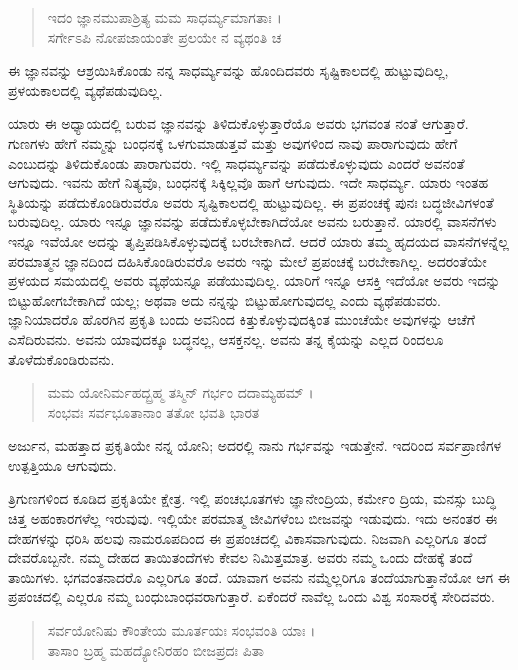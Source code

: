 \begin{verse}
ಇದಂ ಜ್ಞಾನಮುಪಾಶ್ರಿತ್ಯ ಮಮ ಸಾಧರ್ಮ್ಯಮಾಗತಾಃ ।\\ಸರ್ಗೇಽಪಿ ನೋಪಜಾಯಂತೇ ಪ್ರಲಯೇ ನ ವ್ಯಥಂತಿ ಚ 
\end{verse}

{\small ಈ ಜ್ಞಾನವನ್ನು ಆಶ್ರಯಿಸಿಕೊಂಡು ನನ್ನ ಸಾಧರ್ಮ್ಯವನ್ನು ಹೊಂದಿದವರು ಸೃಷ್ಟಿಕಾಲದಲ್ಲಿ ಹುಟ್ಟುವುದಿಲ್ಲ, ಪ್ರಳಯಕಾಲದಲ್ಲಿ ವ್ಯಥೆಪಡುವುದಿಲ್ಲ.}

ಯಾರು ಈ ಅಧ್ಯಾಯದಲ್ಲಿ ಬರುವ ಜ್ಞಾನವನ್ನು ತಿಳಿದುಕೊಳ್ಳುತ್ತಾರೆಯೊ ಅವರು ಭಗವಂತ ನಂತೆ ಆಗುತ್ತಾರೆ. ಗುಣಗಳು ಹೇಗೆ ನಮ್ಮನ್ನು ಬಂಧನಕ್ಕೆ ಒಳಗುಮಾಡುತ್ತವೆ ಮತ್ತು ಅವುಗಳಿಂದ ನಾವು ಪಾರಾಗುವುದು ಹೇಗೆ ಎಂಬುದನ್ನು ತಿಳಿದುಕೊಂಡು ಪಾರಾಗುವರು. ಇಲ್ಲಿ ಸಾಧರ್ಮ್ಯವನ್ನು ಪಡೆದುಕೊಳ್ಳುವುದು ಎಂದರೆ ಅವನಂತೆ ಆಗುವುದು. ಇವನು ಹೇಗೆ ನಿತ್ಯವೊ, ಬಂಧನಕ್ಕೆ ಸಿಕ್ಕಿಲ್ಲವೊ ಹಾಗೆ ಆಗುವುದು. ಇದೇ ಸಾಧರ್ಮ್ಯ. ಯಾರು ಇಂತಹ ಸ್ಥಿತಿಯನ್ನು ಪಡೆದುಕೊಂಡಿರುವರೊ ಅವರು ಸೃಷ್ಟಿಕಾಲದಲ್ಲಿ ಹುಟ್ಟುವುದಿಲ್ಲ. ಈ ಪ್ರಪಂಚಕ್ಕೆ ಪುನಃ ಬದ್ಧಜೀವಿಗಳಂತೆ ಬರುವುದಿಲ್ಲ. ಯಾರು ಇನ್ನೂ ಜ್ಞಾನವನ್ನು ಪಡೆದುಕೊಳ್ಳಬೇಕಾಗಿದೆಯೋ ಅವನು ಬರುತ್ತಾನೆ. ಯಾರಲ್ಲಿ ವಾಸನೆಗಳು ಇನ್ನೂ ಇವೆಯೋ ಅದನ್ನು ತೃಪ್ತಿಪಡಿಸಿಕೊಳ್ಳುವುದಕ್ಕೆ ಬರಬೇಕಾಗಿದೆ. ಆದರೆ ಯಾರು ತಮ್ಮ ಹೃದಯದ ವಾಸನೆಗಳನ್ನೆಲ್ಲ ಪರಮಾತ್ಮನ ಜ್ಞಾನದಿಂದ ದಹಿಸಿಕೊಂಡಿರುವರೊ ಅವರು ಇನ್ನು ಮೇಲೆ ಪ್ರಪಂಚಕ್ಕೆ ಬರಬೇಕಾಗಿಲ್ಲ. ಅದರಂತೆಯೇ ಪ್ರಳಯದ ಸಮಯದಲ್ಲಿ ಅವರು ವ್ಯಥೆಯನ್ನೂ ಪಡೆಯುವುದಿಲ್ಲ. ಯಾರಿಗೆ ಇನ್ನೂ ಆಸಕ್ತಿ ಇದೆಯೋ ಅವರು ಇದನ್ನು ಬಿಟ್ಟುಹೋಗಬೇಕಾಗಿದೆ ಯಲ್ಲ; ಅಥವಾ ಅದು ನನ್ನನ್ನು ಬಿಟ್ಟುಹೋಗುವುದಲ್ಲ ಎಂದು ವ್ಯಥೆಪಡುವರು. ಜ್ಞಾನಿಯಾದರೊ ಹೊರಗಿನ ಪ್ರಕೃತಿ ಬಂದು ಅವನಿಂದ ಕಿತ್ತುಕೊಳ್ಳುವುದಕ್ಕಿಂತ ಮುಂಚೆಯೇ ಅವುಗಳನ್ನು ಆಚೆಗೆ ಎಸೆದಿರುವನು. ಅವನು ಯಾವುದಕ್ಕೂ ಬದ್ಧನಲ್ಲ, ಆಸಕ್ತನಲ್ಲ. ಅವನು ತನ್ನ ಕೈಯನ್ನು ಎಲ್ಲದ ರಿಂದಲೂ ತೊಳೆದುಕೊಂಡಿರುವನು.

\begin{verse}
ಮಮ ಯೋನಿರ್ಮಹದ್ಬ್ರಹ್ಮ ತಸ್ಮಿನ್ ಗರ್ಭಂ ದದಾಮ್ಯಹಮ್ ।\\ಸಂಭವಃ ಸರ್ವಭೂತಾನಾಂ ತತೋ ಭವತಿ ಭಾರತ 
\end{verse}

{\small ಅರ್ಜುನ, ಮಹತ್ತಾದ ಪ್ರಕೃತಿಯೇ ನನ್ನ ಯೋನಿ; ಅದರಲ್ಲಿ ನಾನು ಗರ್ಭವನ್ನು ಇಡುತ್ತೇನೆ. ಇದರಿಂದ ಸರ್ವಪ್ರಾಣಿಗಳ ಉತ್ಪತ್ತಿಯೂ ಆಗುವುದು.}

ತ್ರಿಗುಣಗಳಿಂದ ಕೂಡಿದ ಪ್ರಕೃತಿಯೇ ಕ್ಷೇತ್ರ. ಇಲ್ಲಿ ಪಂಚಭೂತಗಳು ಜ್ಞಾನೇಂದ್ರಿಯ, ಕರ್ಮೇಂ ದ್ರಿಯ, ಮನಸ್ಸು ಬುದ್ಧಿ ಚಿತ್ತ ಅಹಂಕಾರಗಳೆಲ್ಲ ಇರುವುವು. ಇಲ್ಲಿಯೇ ಪರಮಾತ್ಮ ಜೀವಿಗಳೆಂಬ ಬೀಜವನ್ನು ಇಡುವುದು. ಇದು ಅನಂತರ ಈ ದೇಹಗಳನ್ನು ಧರಿಸಿ ಹಲವು ನಾಮರೂಪದಿಂದ ಈ ಪ್ರಪಂಚದಲ್ಲಿ ವಿಕಾಸವಾಗುವುದು. ನಿಜವಾಗಿ ಎಲ್ಲರಿಗೂ ತಂದೆ ದೇವರೊಬ್ಬನೇ. ನಮ್ಮ ದೇಹದ ತಾಯಿತಂದೆಗಳು ಕೇವಲ ನಿಮಿತ್ತಮಾತ್ರ. ಅವರು ನಮ್ಮ ಒಂದು ದೇಹಕ್ಕೆ ತಂದೆ ತಾಯಿಗಳು. ಭಗವಂತನಾದರೊ ಎಲ್ಲರಿಗೂ ತಂದೆ. ಯಾವಾಗ ಅವನು ನಮ್ಮೆಲ್ಲರಿಗೂ ತಂದೆಯಾಗುತ್ತಾನೆಯೋ ಆಗ ಈ ಪ್ರಪಂಚದಲ್ಲಿ ಎಲ್ಲರೂ ನಮ್ಮ ಬಂಧುಬಾಂಧವರಾಗುತ್ತಾರೆ. ಏಕೆಂದರೆ ನಾವೆಲ್ಲ ಒಂದು ವಿಶ್ವ ಸಂಸಾರಕ್ಕೆ ಸೇರಿದವರು.

\begin{verse}
ಸರ್ವಯೋನಿಷು ಕೌಂತೇಯ ಮೂರ್ತಯಃ ಸಂಭವಂತಿ ಯಾಃ ।\\ತಾಸಾಂ ಬ್ರಹ್ಮ ಮಹದ್ಯೋನಿರಹಂ ಬೀಜಪ್ರದಃ ಪಿತಾ 
\end{verse}

